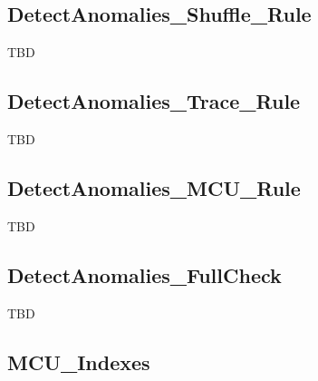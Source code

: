 \subsection*{DetectAnomalies\_Shuffle\_Rule}
 TBD
 \subsection*{DetectAnomalies\_Trace\_Rule}
 TBD
 \subsection*{DetectAnomalies\_MCU\_Rule}
 TBD
 \subsection*{DetectAnomalies\_FullCheck}
 TBD
 \subsection*{MCU\_Indexes}
